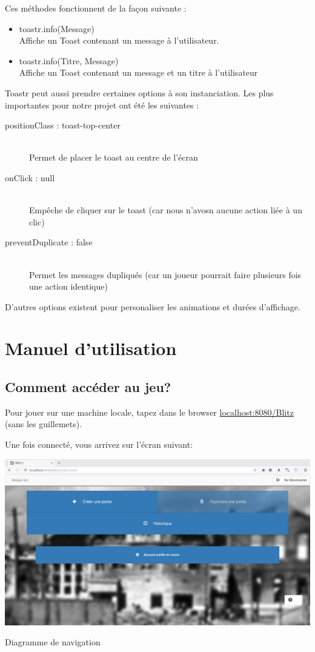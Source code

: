 \documentclass[11pt]{scrreprt}
\begin{document}
    Ces méthodes fonctionnent de la façon suivante :

    \begin{itemize}
        \item toastr.info(\og Message\fg)\\ Affiche un Toast contenant un message à l'utilisateur.
        \item toastr.info(\og Titre\fg, \og Message\fg)\\ Affiche un Toast contenant un message et un titre à l'utilisateur
    \end{itemize}

    Toastr peut aussi prendre certaines options à son instanciation. Les plus importantes pour notre projet ont été les suivantes :

    \begin{description}
        \item[positionClass : toast-top-center]\hfill \\ Permet de placer le toast au centre de l'écran
        \item[onClick : null]\hfill \\ Empêche de cliquer sur le toast (car nous n'avosn aucune action liée à un clic)
        \item[preventDuplicate : false]\hfill \\ Permet les messages dupliqués (car un joueur pourrait faire plusieurs fois une action identique)
    \end{description}

    D'autres options existent pour personaliser les animations et durées d'affichage.

    \section{Manuel d'utilisation}
    \subsection{Comment accéder au jeu?}
    Pour jouer sur une machine locale, tapez dans le browser \og \url{localhost:8080/Blitz}\fg{} (sans les guillemets).

    Une fois connecté, vous arrivez sur l'écran suivant:

    \begin{table}[H]
        \centering
        \includegraphics[width=\textwidth]{images/accueil.png}
        \caption{Diagramme de navigation}
    \end{table}
\end{document}
